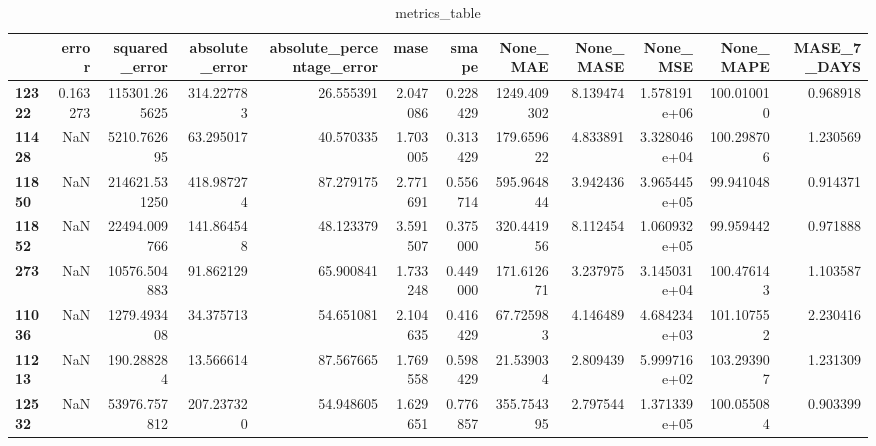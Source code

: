 \begin{table}[h]
\centering
\caption{metrics_table}
\label{table:Final tune for dataset seasonal lstm global univariate. After smape fix}
\begin{tabular}{lrrrrrrrrrrr}
\toprule
{} &     error &  squared\_error &  absolute\_error &  absolute\_percentage\_error &      mase &     smape &     None\_MAE &  None\_MASE &      None\_MSE &   None\_MAPE &  MASE\_7\_DAYS \\
\midrule
\textbf{12322} &  0.163273 &  115301.265625 &      314.227783 &                  26.555391 &  2.047086 &  0.228429 &  1249.409302 &   8.139474 &  1.578191e+06 &  100.010010 &     0.968918 \\
\textbf{11428} &       NaN &    5210.762695 &       63.295017 &                  40.570335 &  1.703005 &  0.313429 &   179.659622 &   4.833891 &  3.328046e+04 &  100.298706 &     1.230569 \\
\textbf{11850} &       NaN &  214621.531250 &      418.987274 &                  87.279175 &  2.771691 &  0.556714 &   595.964844 &   3.942436 &  3.965445e+05 &   99.941048 &     0.914371 \\
\textbf{11852} &       NaN &   22494.009766 &      141.864548 &                  48.123379 &  3.591507 &  0.375000 &   320.441956 &   8.112454 &  1.060932e+05 &   99.959442 &     0.971888 \\
\textbf{273  } &       NaN &   10576.504883 &       91.862129 &                  65.900841 &  1.733248 &  0.449000 &   171.612671 &   3.237975 &  3.145031e+04 &  100.476143 &     1.103587 \\
\textbf{11036} &       NaN &    1279.493408 &       34.375713 &                  54.651081 &  2.104635 &  0.416429 &    67.725983 &   4.146489 &  4.684234e+03 &  101.107552 &     2.230416 \\
\textbf{11213} &       NaN &     190.288284 &       13.566614 &                  87.567665 &  1.769558 &  0.598429 &    21.539034 &   2.809439 &  5.999716e+02 &  103.293907 &     1.231309 \\
\textbf{12532} &       NaN &   53976.757812 &      207.237320 &                  54.948605 &  1.629651 &  0.776857 &   355.754395 &   2.797544 &  1.371339e+05 &  100.055084 &     0.903399 \\
\bottomrule
\end{tabular}
\end{table}

